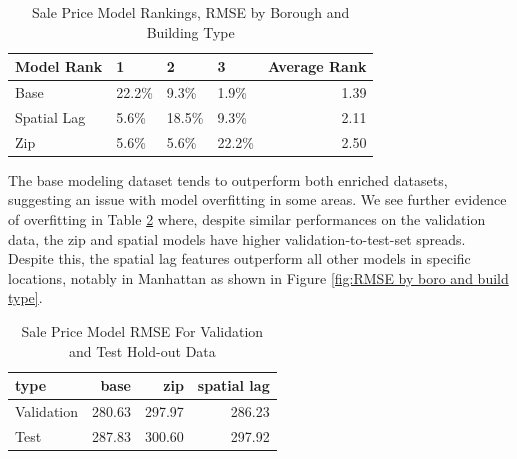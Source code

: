 \documentclass[conference,final,]{IEEEtran}
\begin{document}
\begin{table}

\caption{\label{tab:Sale Price Model Rank Distributions}\label{tab:SalePriceModelRank} Sale Price Model Rankings, RMSE by Borough and Building Type}
\centering
\begin{tabular}[t]{l|l|l|l|r}
\hline
Model Rank & 1 & 2 & 3 & Average Rank\\
\hline
Base & 22.2\% & 9.3\% & 1.9\% & 1.39\\
\hline
Spatial Lag & 5.6\% & 18.5\% & 9.3\% & 2.11\\
\hline
Zip & 5.6\% & 5.6\% & 22.2\% & 2.50\\
\hline
\end{tabular}
\end{table}

The base modeling dataset tends to outperform both enriched datasets,
suggesting an issue with model overfitting in some areas. We see further
evidence of overfitting in Table \ref{tab:SalePriceEval} where, despite
similar performances on the validation data, the zip and spatial models
have higher validation-to-test-set spreads. Despite this, the spatial
lag features outperform all other models in specific locations, notably
in Manhattan as shown in Figure \ref{fig:RMSE by boro and build type}.

\begin{table}

\caption{\label{tab:Sale Price Evaluations}\label{tab:SalePriceEval} Sale Price Model RMSE For Validation and Test Hold-out Data}
\centering
\begin{tabular}[t]{l|r|r|r}
\hline
type & base & zip & spatial lag\\
\hline
Validation & 280.63 & 297.97 & 286.23\\
\hline
Test & 287.83 & 300.60 & 297.92\\
\hline
\end{tabular}
\end{table}
\end{document}
